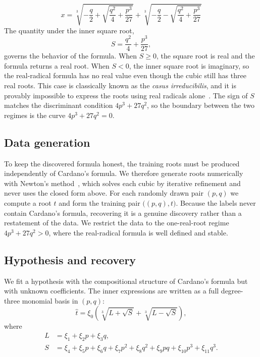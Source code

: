 \documentclass[11pt]{article}
\theoremstyle{plain}
\theoremstyle{definition}
\begin{document}
\begin{equation}
\label{eq:cardano-formula}
x = \sqrt[3]{-\frac{q}{2} + \sqrt{\frac{q^2}{4} + \frac{p^3}{27}}} + \sqrt[3]{-\frac{q}{2} - \sqrt{\frac{q^2}{4} + \frac{p^3}{27}}}
\end{equation}
The quantity under the inner square root,
\begin{equation}
\label{eq:cardano-discriminant}
S = \frac{q^2}{4} + \frac{p^3}{27},
\end{equation}
governs the behavior of the formula. When $S \geq 0$, the square root is real and the formula returns a real root. When $S < 0$, the inner square root is imaginary, so the real-radical formula has no real value even though the cubic still has three real roots. This case is classically known as the \emph{casus irreducibilis}, and it is provably impossible to express the roots using real radicals alone~\cite{degraaf_galois}. The sign of $S$ matches the discriminant condition $4p^3 + 27q^2$, so the boundary between the two regimes is the curve $4p^3 + 27q^2 = 0$.
 
\subsection*{Data generation}
 
To keep the discovered formula honest, the training roots must be produced independently of Cardano's formula. We therefore generate roots numerically with Newton's method~\cite{suli2003numerical}, which solves each cubic by iterative
refinement and never uses the closed form above. For each randomly drawn pair $(p, q)$ we compute a root $t$ and form the training pair
$\big((p, q), t\big)$. Because the labels never contain Cardano's formula, recovering it is a genuine discovery rather than a restatement of the data. We restrict the data to the one-real-root regime $4p^3 + 27q^2 > 0$, where the real-radical formula is well defined and stable.
 
\subsection*{Hypothesis and recovery}
 
We fit a hypothesis with the compositional structure of Cardano's formula
but with unknown coefficients. The inner expressions are written as a full
degree-three monomial basis in $(p, q)$:
\begin{equation}
\label{eq:cubic-hypothesis}
\hat{t} = \xi_0
\left(
\sqrt[3]{L + \sqrt{S}} + \sqrt[3]{L - \sqrt{S}}
\right),
\end{equation}
where
\begin{align}
L &= \xi_1 + \xi_2 p + \xi_3 q, \\
S &= \xi_4 + \xi_5 p + \xi_6 q + \xi_7 p^2 + \xi_8 q^2
     + \xi_9 pq + \xi_{10} p^3 + \xi_{11} q^3.
\end{align}
\end{document}

